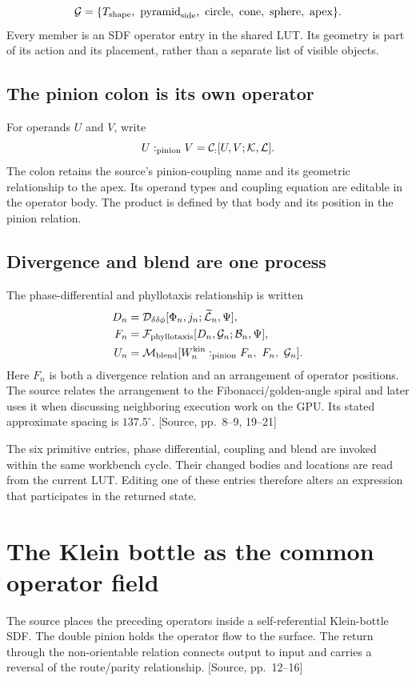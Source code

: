 \documentclass[11pt,a4paper]{article}
\newcommand{\src}[1]{{\sffamily\footnotesize\color{DWGray}[Source, pp.~#1]}}
\newcommand{\Klein}{\mathcal{K}}
\newcommand{\LUT}{\mathcal{L}}
\begin{document}
\begin{equation}
\mathcal{G}=\{
 T_{\rm shape},\ \mathrm{pyramid}_{\rm side},\ \mathrm{circle},\
 \mathrm{cone},\ \mathrm{sphere},\ \mathrm{apex}\}.
\end{equation}
Every member is an SDF operator entry in the shared LUT. Its geometry is part of its action and its placement, rather than a separate list of visible objects.

\subsection{The pinion colon is its own operator}
For operands $U$ and $V$, write
\begin{equation}
U:_{\rm pinion}V
=\mathcal{C}_{:}[U,V;\Klein,\LUT].
\end{equation}
The colon retains the source's pinion-coupling name and its geometric relationship to the apex. Its operand types and coupling equation are editable in the operator body. The product is defined by that body and its position in the pinion relation.

\subsection{Divergence and blend are one process}
The phase-differential and phyllotaxis relationship is written
\begin{align}
D_n&=\mathcal{D}_{\delta\delta\phi}
 [\Phi_n,j_n;\widetilde{\LUT}_n,\Psi],\\
F_n&=\mathcal{F}_{\rm phyllotaxis}
 [D_n,\mathcal{G}_n;\mathcal{B}_n,\Psi],\\
U_n&=\mathcal{M}_{\rm blend}
 [W^{\rm kin}_n:_{\rm pinion}F_n,\ F_n,\ \mathcal{G}_n].
\end{align}
Here $F_n$ is both a divergence relation and an arrangement of operator positions. The source relates the arrangement to the Fibonacci/golden-angle spiral and later uses it when discussing neighboring execution work on the GPU. Its stated approximate spacing is $137.5^{\circ}$. \src{8--9, 19--21}

The six primitive entries, phase differential, coupling and blend are invoked within the same workbench cycle. Their changed bodies and locations are read from the current LUT. Editing one of these entries therefore alters an expression that participates in the returned state.
\clearpage

\section{The Klein bottle as the common operator field}
The source places the preceding operators inside a self-referential Klein-bottle SDF. The double pinion holds the operator flow to the surface. The return through the non-orientable relation connects output to input and carries a reversal of the route/parity relationship. \src{12--16}
\end{document}
